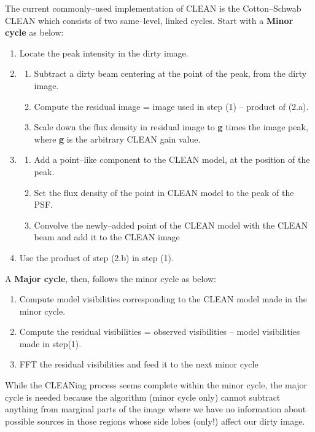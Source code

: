 \documentclass[a4wide,12pt]{book}
\begin{document}
The current commonly--used implementation of CLEAN is the Cotton--Schwab CLEAN which consists of two same--level, linked cycles.
Start with a {\bf Minor cycle} as below:
\begin{enumerate}
\item Locate the peak intensity in the dirty image.
\item\begin{enumerate}
    \item Subtract a dirty beam centering at the point of the peak, from the dirty image.
    \item Compute the residual image = image used in step (1) -- product of (2.a).
    \item Scale down the flux density in residual image to {\bf g} times the image peak, where {\bf g} is the arbitrary CLEAN gain value.
    \end{enumerate}
\item\begin{enumerate}
    \item Add a point--like component to the CLEAN model, at the position of the peak.
    \item Set the flux density of the point in CLEAN model to the peak of the PSF.
    \item Convolve the newly--added point of the CLEAN model with the CLEAN beam and add it to the CLEAN image
    \end{enumerate}
\item Use the product of step (2.b) in step (1). 
\end{enumerate}
A {\bf Major cycle}, then, follows the minor cycle as below:
\begin{enumerate}
\item Compute model visibilities corresponding to the CLEAN model made in the minor cycle.
\item Compute the residual visibilities = observed visibilities -- model visibilities made in step(1).
\item FFT the residual visibilities and feed it to the next minor cycle 
\end{enumerate}

While the CLEANing process seems complete within the minor cycle, the major cycle is needed because the algorithm (minor cycle only) cannot subtract anything from marginal parts of the image where we have no information about possible sources in those regions whose side lobes (only!) affect our dirty image.

\end{document}
